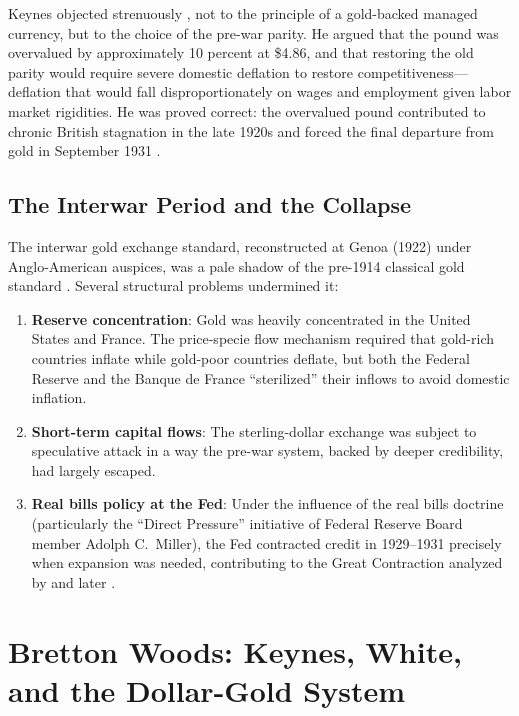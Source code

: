 \documentclass[12pt]{article}
\begin{document}
Keynes objected strenuously \citep{Keynes1925}, not to the
principle of a gold-backed managed currency, but to the choice
of the pre-war parity.  He argued that the pound was overvalued
by approximately 10 percent at \$4.86, and that restoring the
old parity would require severe domestic deflation to restore
competitiveness---deflation that would fall disproportionately on
wages and employment given labor market rigidities.  He was proved
correct: the overvalued pound contributed to chronic British
stagnation in the late 1920s and forced the final departure from
gold in September 1931 \citep{Eichengreen1992}.

\subsection{The Interwar Period and the Collapse}

The interwar gold exchange standard, reconstructed at Genoa (1922)
under Anglo-American auspices, was a pale shadow of the pre-1914
classical gold standard \citep{Eichengreen1992, Nurkse1944}.
Several structural problems undermined it:

\begin{enumerate}
  \item \textbf{Reserve concentration}:  Gold was heavily
        concentrated in the United States and France.  The price-specie
        flow mechanism required that gold-rich countries inflate while
        gold-poor countries deflate, but both the Federal Reserve and
        the Banque de France ``sterilized'' their inflows to avoid
        domestic inflation.
  \item \textbf{Short-term capital flows}:  The sterling-dollar
        exchange was subject to speculative attack in a way the
        pre-war system, backed by deeper credibility, had largely
        escaped.
  \item \textbf{Real bills policy at the Fed}:  Under the influence
        of the real bills doctrine (particularly the ``Direct Pressure''
        initiative of Federal Reserve Board member Adolph C.\ Miller),
        the Fed contracted credit in 1929--1931 precisely when
        expansion was needed, contributing to the Great Contraction
        analyzed by \citet{FriedmanSchwartz1963} and later
        \citet{HumphreyTimberlake2019}.
\end{enumerate}

\section{Bretton Woods: Keynes, White, and the Dollar-Gold System}
\label{sec:bretton-woods}
\end{document}
